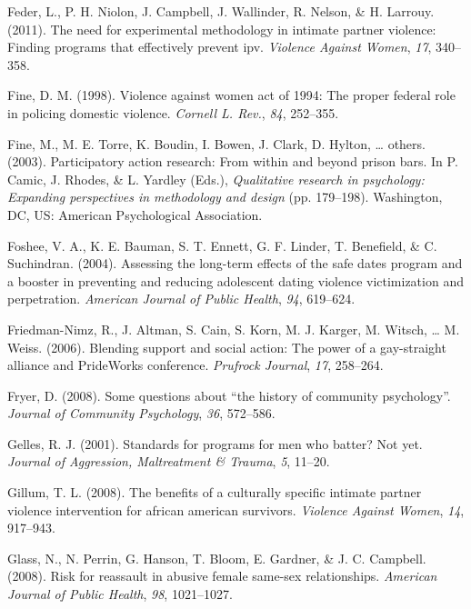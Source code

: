 \documentclass[11pt,]{tufte-book}
\begin{document}
\hypertarget{ref-feder2011need}{}
Feder, L., P. H. Niolon, J. Campbell, J. Wallinder, R. Nelson, \& H.
Larrouy. (2011). The need for experimental methodology in intimate
partner violence: Finding programs that effectively prevent ipv.
\emph{Violence Against Women}, \emph{17}, 340--358.

\hypertarget{ref-fine1998violence}{}
Fine, D. M. (1998). Violence against women act of 1994: The proper
federal role in policing domestic violence. \emph{Cornell L. Rev.},
\emph{84}, 252--355.

\hypertarget{ref-fine2003participatory}{}
Fine, M., M. E. Torre, K. Boudin, I. Bowen, J. Clark, D. Hylton,
\ldots{} others. (2003). Participatory action research: From within and
beyond prison bars. In P. Camic, J. Rhodes, \& L. Yardley (Eds.),
\emph{Qualitative research in psychology: Expanding perspectives in
methodology and design} (pp. 179--198). Washington, DC, US: American
Psychological Association.

\hypertarget{ref-foshee2004assessing}{}
Foshee, V. A., K. E. Bauman, S. T. Ennett, G. F. Linder, T. Benefield,
\& C. Suchindran. (2004). Assessing the long-term effects of the safe
dates program and a booster in preventing and reducing adolescent dating
violence victimization and perpetration. \emph{American Journal of
Public Health}, \emph{94}, 619--624.

\hypertarget{ref-friedman-nimz2006blending}{}
Friedman-Nimz, R., J. Altman, S. Cain, S. Korn, M. J. Karger, M. Witsch,
\ldots{} M. Weiss. (2006). Blending support and social action: The power
of a gay-straight alliance and PrideWorks conference. \emph{Prufrock
Journal}, \emph{17}, 258--264.

\hypertarget{ref-fryer2008some}{}
Fryer, D. (2008). Some questions about ``the history of community
psychology''. \emph{Journal of Community Psychology}, \emph{36},
572--586.

\hypertarget{ref-gelles2001standards}{}
Gelles, R. J. (2001). Standards for programs for men who batter? Not
yet. \emph{Journal of Aggression, Maltreatment \& Trauma}, \emph{5},
11--20.

\hypertarget{ref-gillum2008benefits}{}
Gillum, T. L. (2008). The benefits of a culturally specific intimate
partner violence intervention for african american survivors.
\emph{Violence Against Women}, \emph{14}, 917--943.

\hypertarget{ref-glass2008risk}{}
Glass, N., N. Perrin, G. Hanson, T. Bloom, E. Gardner, \& J. C.
Campbell. (2008). Risk for reassault in abusive female same-sex
relationships. \emph{American Journal of Public Health}, \emph{98},
1021--1027.
\end{document}
